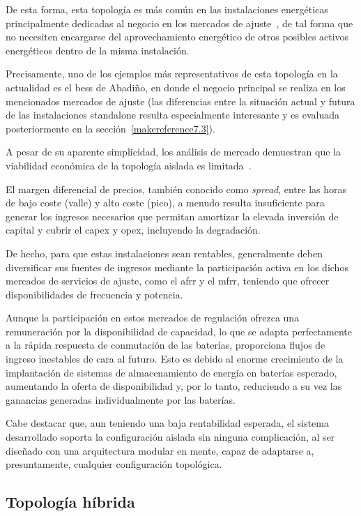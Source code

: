 De esta forma, esta topología es más común en las instalaciones energéticas principalmente dedicadas al negocio en los mercados de ajuste~\cite{carbajo2007mercados}, de tal forma que no necesiten encargarse del aprovechamiento energético de otros posibles activos energéticos dentro de la misma instalación.

Precisamente, uno de los ejemplos más representativos de esta topología en la actualidad es el \gls{bess} de Abadiño, en donde el negocio principal se realiza en los mencionados mercados de ajuste (las diferencias entre la situación actual y futura de las instalaciones standalone resulta especialmente interesante y es evaluada posteriormente en la sección~\ref{makereference7.3}).

A pesar de su aparente simplicidad, los análisis de mercado demuestran que la viabilidad económica de la topología aislada es limitada~\cite{azahra2020optimized, baviskar2023opportunities, kalenderova2024batery}.

El margen diferencial de precios, también conocido como \textit{spread}, entre las horas de bajo coste (valle) y alto coste (pico), a menudo resulta insuficiente para generar los ingresos necesarios que permitan amortizar la elevada inversión de capital y cubrir el \gls{capex} y \gls{opex}, incluyendo la degradación.

De hecho, para que estas instalaciones sean rentables, generalmente deben diversificar sus fuentes de ingresos mediante la participación activa en los dichos mercados de servicios de ajuste, como el \gls{afrr} y el \gls{mfrr}, teniendo que ofrecer disponibilidades de frecuencia y potencia.

Aunque la participación en estos mercados de regulación ofrezca una remuneración por la disponibilidad de capacidad, lo que se adapta perfectamente a la rápida respuesta de conmutación de las baterías, proporciona flujos de ingreso inestables de cara al futuro. Esto es debido al enorme crecimiento de la implantación de sistemas de almacenamiento de energía en baterías esperado, aumentando la oferta de disponibilidad y, por lo tanto, reduciendo a su vez las ganancias generadas individualmente por las baterías.

Cabe destacar que, aun teniendo una baja rentabilidad esperada, el sistema desarrollado soporta la configuración aislada sin ninguna complicación, al ser diseñado con una arquitectura modular en mente, capaz de adaptarse a, presuntamente, cualquier configuración topológica.

\subsection{Topología híbrida}%
\label{makereference3.1.2}

